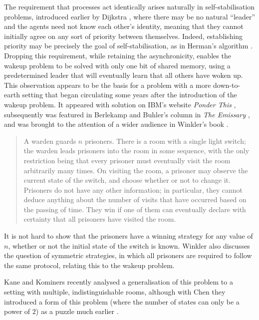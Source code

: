 \documentclass[a4paper,11pt]{extarticle}
\theoremstyle{definition}
\theoremstyle{remark}
\begin{document}
	The requirement that processes act identically arises naturally in self-stabilisation problems, introduced earlier by Dijkstra \cite{Dij74}, where there may be no natural ``leader'' and the agents need not know each other's identity, meaning that they cannot initially agree on any sort of priority between themselves. Indeed, establishing priority may be precisely the goal of self-stabilisation, as in Herman's algorithm \cite{Her90}.
	Dropping this requirement, while retaining the asynchronicity, enables the wakeup problem to be solved with only one bit of shared memory, using a predetermined leader that will eventually learn that all others have woken up. This observation appears to be the basis for a problem with a more down-to-earth setting that began circulating some years after the introduction of the wakeup problem. It appeared with solution on IBM's website \textit{Ponder This} \cite{ponder}, subsequently was featured in Berlekamp and Buhler's column in \textit{The Emissary} \cite{BB02}, and was brought to the attention of a wider audience in Winkler's book \cite{Win04}.
	
	\begin{quote}A warden guards $n$ prisoners. There is a room with a single light switch; the warden leads prisoners into the room in some sequence, with the only restriction being that every prisoner must eventually visit the room arbitrarily many times. On visiting the room, a prisoner may observe the current state of the switch, and choose whether or not to change it. Prisoners do not have any other information; in particular, they cannot deduce anything about the number of visits that have occurred based on the passing of time. They win if one of them can eventually declare with certainty that all prisoners have visited the room.\end{quote} 
	
	It is not hard to show that the prisoners have a winning strategy for any value of $n$, whether or not the initial state of the switch is known. Winkler also discusses the question of symmetric strategies, in which all prisoners are required to follow the same protocol, relating this to the wakeup problem.
	
	Kane and Kominers \cite{KK21} recently analysed a generalisation of this problem to a setting with multiple, indistinguishable rooms, although with Chen they introduced a form of this problem (where the number of states can only be a power of $2$) as a puzzle much earlier \cite{KKC08}.
	
\end{document}
